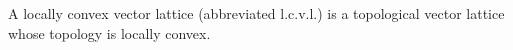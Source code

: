 A locally convex vector lattice (abbreviated l.c.v.l.) is a topological vector lattice whose topology is locally convex.
